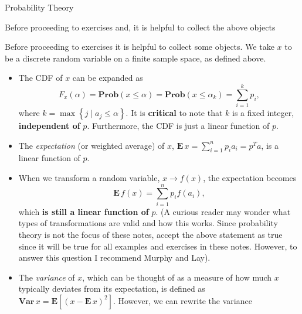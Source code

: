 \begin{chapter}{Probability Theory}

    Before proceeding to exercises and, it is helpful to collect the above objects 
    
    Before proceeding to exercises it is helpful to collect some objects. We take $x$ to be a
    discrete random variable on a finite sample space, as defined above.


    \begin{itemize}
        \item The CDF of $x$ can be expanded as
        \[F_x(\alpha) = \mathbf{Prob}\left(x \le \alpha\right) = \mathbf{Prob}\left(x \le \alpha_k\right) = \sum_{i=1}^{k}p_i,\]
        where $k = \max \left\{ j \mid a_j \le \alpha \right\}$. It is \textbf{critical} to note that $k$ is a fixed integer,
        \textbf{independent of} $p$. Furthermore, the CDF is just a linear function of $p$.
        \item The \textit{expectation} (or weighted average) of $x$, $\mathbf{E} \, x = \sum_{i=1}^{n}p_ia_i = p^Ta$, is a linear function of $p$.
        \item When we transform a random variable, $x \to f(x)$,
        the expectation becomes
        \[\mathbf{E}\, f(x) = \sum_{i=1}^{n}p_if(a_i),\]
        which \textbf{is still a linear function of} $p$.
        (A curious reader may wonder what types of transformations are valid and how this works.
        Since probability theory is not the focus of these notes, accept the above statement as true since
        it will be true for all examples and exercises in these notes. However, to answer this question I recommend Murphy and Lay). %
        \item The \textit{variance} of $x$, which can be thought of as a measure of how much $x$ typically deviates from its expectation,
        is defined as $\mathbf{Var} \, x  = \mathbf{E}\left[ (x - \mathbf{E}\, x)^2 \right]$. However, we can rewrite the variance

\end{itemize}
\end{chapter}
